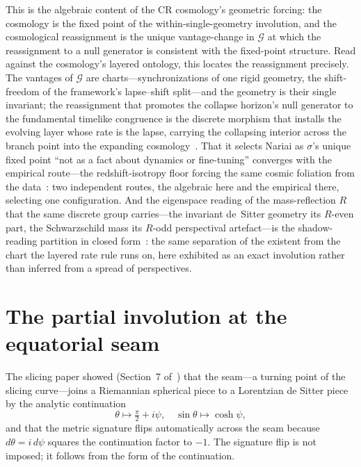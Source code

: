 \documentclass[11pt,a4paper]{article}
\theoremstyle{definition}
\begin{document}
This is the algebraic content of the CR cosmology's geometric forcing: the cosmology is the fixed point of the within-single-geometry involution, and the cosmological reassignment is the unique vantage-change in $\mathcal{G}$ at which the reassignment to a null generator is consistent with the fixed-point structure. Read against the cosmology's layered ontology, this locates the reassignment precisely. The vantages of $\mathcal{G}$ are charts---synchronizations of one rigid geometry, the shift-freedom of the framework's lapse--shift split---and the geometry is their single invariant; the reassignment that promotes the collapse horizon's null generator to the fundamental timelike congruence is the discrete morphism that installs the evolving layer whose rate is the lapse, carrying the collapsing interior across the branch point into the expanding cosmology~\cite{JanzenCRframework, JanzenCosmogenesis}. That it selects Nariai as $\sigma$'s unique fixed point ``not as a fact about dynamics or fine-tuning'' converges with the empirical route---the redshift-isotropy floor forcing the same cosmic foliation from the data~\cite{JanzenModernParallax}: two independent routes, the algebraic here and the empirical there, selecting one configuration. And the eigenspace reading of the mass-reflection $R$ that the same discrete group carries---the invariant de~Sitter geometry its $R$-even part, the Schwarzschild mass its $R$-odd perspectival artefact---is the shadow-reading partition in closed form~\cite{JanzenShadowExistence}: the same separation of the existent from the chart the layered rate rule runs on, here exhibited as an exact involution rather than inferred from a spread of perspectives.

\section{The partial involution at the equatorial seam}\label{sec:seam}

The slicing paper showed (Section~7 of~\cite{JanzenSlicing}) that the seam---a turning point of the slicing curve---joins a Riemannian spherical piece to a Lorentzian de Sitter piece by the analytic continuation
\begin{equation}\label{eq:seam}
\theta\mapsto \tfrac{\pi}{2}+i\psi,\quad \sin\theta\mapsto \cosh\psi,
\end{equation}
and that the metric signature flips automatically across the seam because $d\theta=i\,d\psi$ squares the continuation factor to $-1$. The signature flip is not imposed; it follows from the form of the continuation.
\end{document}
